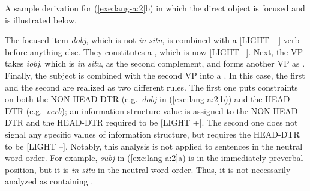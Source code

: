   



\noindent A sample derivation for (\ref{exe:lang-a:2}b) in which the
direct object is focused and  is illustrated below.




\noindent The focused item \textit{dobj}, which is not \textit{in
  situ}, is combined with a [LIGHT +] verb before anything else. They
constitutes a , which is now [LIGHT --]. Next,
the VP takes \textit{iobj}, which is \textit{in situ}, as the second
complement, and forms another VP as . Finally,
the subject is combined with the second VP into a
.  In this case, the first and the second
 are realized as two different rules. The first
one puts constraints on both the NON-HEAD-DTR (e.g.\ \textit{dobj} in
(\ref{exe:lang-a:2}b)) and the HEAD-DTR (e.g.\ \textit{verb}); an
information structure value  is assigned to the
NON-HEAD-DTR and the HEAD-DTR required to be [LIGHT +].
The second one does not signal any specific values of information
structure, but requires the HEAD-DTR to be [LIGHT --]. Notably, this
analysis is not applied to sentences in the neutral word order. For
example, \textit{subj} in (\ref{exe:lang-a:2}a) is in the immediately
preverbal position, but it is \textit{in situ} in the neutral word
order. Thus, it is not necessarily analyzed as containing .







